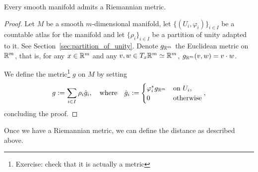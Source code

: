 \begin{theorem}
	Every smooth manifold admits a Riemannian metric.
\end{theorem}
\begin{proof}
	Let $M$ be a smooth $m$-dimensional manifold, let $\{(U_i, \varphi_i)\}_{i\in I}$ be a countable atlas for the manifold and let $\{\rho_i\}_{i\in I}$ be a partition of unity adapted to it. See Section~\ref{sec:partition_of_unity}.
	Denote $g_{\mathbb{R}^m}$ the Euclidean metric on $\mathbb{R}^m$, that is, for any $x \in \mathbb{R}^m$ and any $v,w \in T_x\mathbb{R}^m\simeq\mathbb{R}^m$, $g_{\mathbb{R}^m}(v, w) = v \cdot w$.

	We define the metric\footnote{Exercise: check that it is actually a metric} $g$ on $M$ by setting
	\begin{align}
		g := \sum_{i\in I} \rho_i \hat{g}_i,
		\quad\mbox{where}\quad
		\hat{g}_i := \begin{cases}
			             \varphi_i^* g_{\mathbb{R}^m} & \mbox{on } U_i,  \\
			             0                    & \mbox{otherwise}
		             \end{cases},
	\end{align}
	concluding the proof.
\end{proof}

Once we have a Riemannian metric, we can define the distance as described above.
